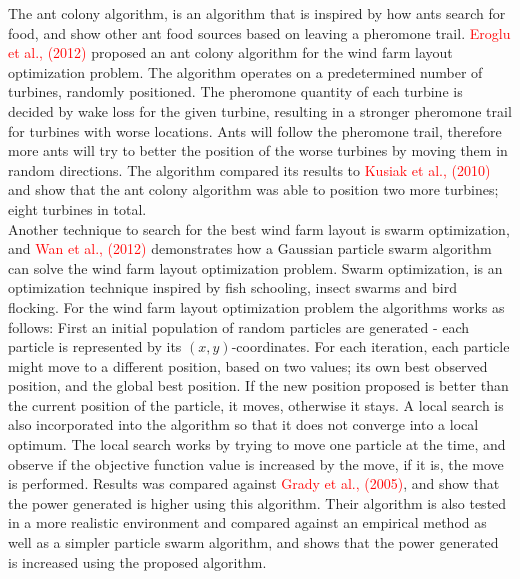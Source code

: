 \noindent The ant colony algorithm, is an algorithm that is inspired by how ants search for food, and show other ant food sources based on leaving a pheromone trail. \textcolor{red}{Eroglu et al., (2012)} proposed an ant colony algorithm for the wind farm layout optimization problem. The algorithm operates on a predetermined number of turbines, randomly positioned. The pheromone quantity of each turbine is decided by wake loss for the given turbine, resulting in a stronger pheromone trail for turbines with worse locations. Ants will follow the pheromone trail, therefore more ants will try to better the position of the worse turbines by moving them in random directions. The algorithm compared its results to \textcolor{red}{Kusiak et al., (2010)} and show that the ant colony algorithm was able to position two more turbines; eight turbines in total. \\


\noindent Another technique to search for the best wind farm layout is swarm optimization, and \textcolor{red}{Wan et al., (2012)} demonstrates how a Gaussian particle swarm algorithm can solve the wind farm layout optimization problem. Swarm optimization, is an optimization technique inspired by fish schooling, insect swarms and bird flocking. For the wind farm layout optimization problem the algorithms works as follows: First an initial population of random particles are generated - each particle is represented by its $(x, y)$-coordinates. For each iteration, each particle might move to a different position, based on two values; its own best observed position, and the global best position. If the new position proposed is better than the current position of the particle, it moves, otherwise it stays. A local search is also incorporated into the algorithm so that it does not converge into a local optimum. The local search works by trying to move one particle at the time, and observe if the objective function value is increased by the move, if it is, the move is performed. Results was compared against \textcolor{red}{Grady et al., (2005)}, and show that the power generated is higher using this algorithm. Their algorithm is also tested in a more realistic environment and compared against an empirical method as well as a simpler particle swarm algorithm, and shows that the power generated is increased using the proposed algorithm. \\


